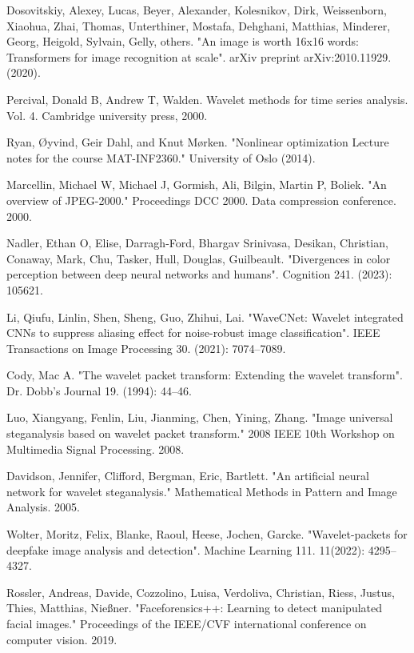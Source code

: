 \documentclass{svproc}
\begin{document}
\begin{thebibliography}{6}
Dosovitskiy, Alexey, Lucas, Beyer, Alexander, Kolesnikov, Dirk, Weissenborn, Xiaohua, Zhai, Thomas, Unterthiner, Mostafa, Dehghani, Matthias, Minderer, Georg, Heigold, Sylvain, Gelly, others. "An image is worth 16x16 words: Transformers for image recognition at scale". arXiv preprint arXiv:2010.11929. (2020).

Percival, Donald B, Andrew T, Walden. Wavelet methods for time series analysis. Vol. 4. Cambridge university press, 2000.

Ryan, Øyvind, Geir Dahl, and Knut Mørken. "Nonlinear optimization Lecture notes for the course MAT-INF2360." University of Oslo (2014).

Marcellin, Michael W, Michael J, Gormish, Ali, Bilgin, Martin P, Boliek. "An overview of JPEG-2000." Proceedings DCC 2000. Data compression conference. 2000.

Nadler, Ethan O, Elise, Darragh-Ford, Bhargav Srinivasa, Desikan, Christian, Conaway, Mark, Chu, Tasker, Hull, Douglas, Guilbeault. "Divergences in color perception between deep neural networks and humans". Cognition 241. (2023): 105621.

Li, Qiufu, Linlin, Shen, Sheng, Guo, Zhihui, Lai. "WaveCNet: Wavelet integrated CNNs to suppress aliasing effect for noise-robust image classification". IEEE Transactions on Image Processing 30. (2021): 7074–7089.

Cody, Mac A. "The wavelet packet transform: Extending the wavelet transform". Dr. Dobb's Journal 19. (1994): 44–46.

Luo, Xiangyang, Fenlin, Liu, Jianming, Chen, Yining, Zhang. "Image universal steganalysis based on wavelet packet transform." 2008 IEEE 10th Workshop on Multimedia Signal Processing. 2008.

Davidson, Jennifer, Clifford, Bergman, Eric, Bartlett. "An artificial neural network for wavelet steganalysis." Mathematical Methods in Pattern and Image Analysis. 2005.

Wolter, Moritz, Felix, Blanke, Raoul, Heese, Jochen, Garcke. "Wavelet-packets for deepfake image analysis and detection". Machine Learning 111. 11(2022): 4295–4327.

Rossler, Andreas, Davide, Cozzolino, Luisa, Verdoliva, Christian, Riess, Justus, Thies, Matthias, Nießner. "Faceforensics++: Learning to detect manipulated facial images." Proceedings of the IEEE/CVF international conference on computer vision. 2019.


\end{thebibliography}
\end{document}
